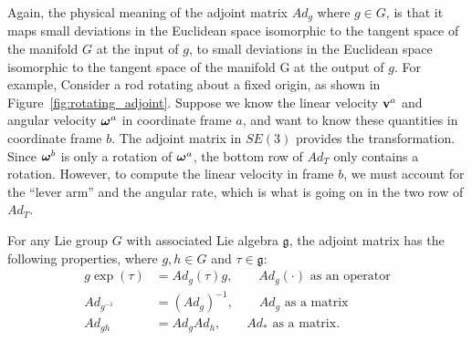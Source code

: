 Again, the physical meaning of the adjoint matrix $Ad_g$ where $g\in G$, is that it maps small deviations in the Euclidean space isomorphic to the tangent space of the manifold $G$ at the input of $g$, to small deviations in the Euclidean space isomorphic to the tangent space of the manifold G at the output of $g$.
For example, Consider a rod rotating about a fixed origin, as shown in Figure~\ref{fig:rotating_adjoint}.
Suppose we know the linear velocity $\mathbf{v}^a$ and angular velocity $\boldsymbol{\omega}^a$ in coordinate frame
$a$, and want to know these quantities in coordinate frame $b$.  The adjoint matrix in $SE(3)$ provides the transformation.  
Since $\boldsymbol{\omega}^b$ is only a rotation of $\boldsymbol{\omega}^a$, the bottom row of $Ad_T$ only contains a rotation. However, to compute
the linear velocity in frame $b$, we must account for the ``lever arm'' and the angular rate, which is what is going on in the two row of $Ad_T$. 


 
For any Lie group $G$ with associated Lie algebra $\mathfrak{g}$, the adjoint matrix has the following properties, where $g, h\in G$ and $\tau\in\mathfrak{g}$:
\begin{align*}
g \exp(\tau) &= Ad_g(\tau) g, \qquad \text{$Ad_g(\cdot)$ as an operator}\\
Ad_{g^{-1}} &= (Ad_g)^{-1}, \qquad \text{$Ad_g$ as a matrix} \\
Ad_{gh} &= Ad_g Ad_h, \qquad \text{$Ad_\ast$ as a matrix}.
\end{align*}


